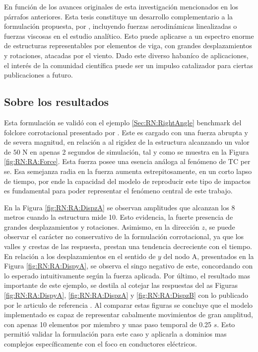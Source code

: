 En función de los avances originales de esta investigación mencionados en los párrafos anteriores. Esta tesis constituye un desarrollo complementario a la formulación propuesta, por \cite{Le2014}, incluyendo fuerzas aerodinámicas linealizadas o fuerzas viscosas en el estudio analítico. Esto puede aplicarse a un espectro enorme de estructuras representables por elementos de viga, con grandes desplazamientos y rotaciones, atacadas por el viento. Dado este diverso habaníco de aplicaciones, el interés de la comunidad científica puede ser un impulso catalizador para ciertas publicaciones a futuro.


\subsection{Sobre los resultados}

Esta formulación se validó con el ejemplo \ref{Sec:RN:RightAngle} benchmark del folclore corrotacional presentado por \cite{simo1988dynamics}. Este es cargado con una fuerza abrupta y de severa magnitud, en relación  a al  rigidez de la estructura alcanzando un valor de $50$ N en apenas 2 segundos de simulación, tal y como se muestra en la Figura \ref{fig:RN:RA:Force}. Esta fuerza posee una esencia análoga al fenómeno de TC per se. Esa semejanza radia en la fuerza aumenta estrepitosamente, en un corto lapso de tiempo, por ende la capacidad del modelo de reproducir este tipo de impactos es fundamental para poder representar el fenómeno central de este trabajo.

 En la Figura \ref{fig:RN:RA:DispzA} se observan amplitudes que alcanzan los 8 metros cuando la estructura mide 10. Esto evidencia, la fuerte presencia de grandes desplazamientos y rotaciones. Asimismo, en la dirección $z$, se puede observar el carácter no conservativo de la formulación corrotacional, ya que los valles y crestas de las respuesta, prestan una tendencia decreciente con el tiempo. En relación a los desplazamientos en el sentido de $y$ del nodo A, presentados en la Figura \ref{fig:RN:RA:DispyA}, se observa el singo negativo de este, concordando con lo esperado intuitivamente según la fuerza aplicada. Por último, el resultado mas importante de este ejemplo, se destila al cotejar las respuestas del as Figuras \ref{fig:RN:RA:DispyA}, \ref{fig:RN:RA:DispzA} y \ref{fig:RN:RA:DispzB} con lo publicado por le articulo de referencia \citep{Le2014}. Al comparar estas figuras se concluye que el modelo implementado es capaz de representar cabalmente movimientos de gran amplitud, con apenas 10 elementos por miembro y unas paso temporal de 0.25 $s$. Esto permitió validar la formulación para este caso y aplicarla a dominios mas complejos específicamente con el foco en conductores eléctricos. 

